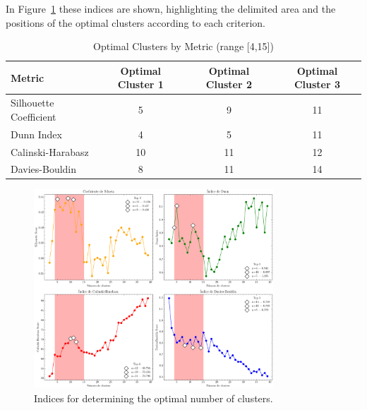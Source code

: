 \documentclass[10pt]{article}
\begin{document}
In Figure~\ref{fig:miGrafico12} these indices are shown, highlighting the delimited area and the positions of the optimal clusters according to each criterion.


\begin{table}[h]
    \centering
    \caption{Optimal Clusters by Metric (range [4,15])}
    \label{tab:clusters_optimos_masculine}
    \renewcommand{\arraystretch}{1.2}
    \begin{tabular}{@{}lccc@{}}
        \toprule
        \textbf{Metric}         & \textbf{Optimal Cluster 1} & \textbf{Optimal Cluster 2} & \textbf{Optimal Cluster 3} \\
        \midrule
        Silhouette Coefficient  & 5                        & 9                        & 11                       \\
        Dunn Index              & 4                        & 5                        & 11                       \\
        Calinski-Harabasz       & 10                       & 11                       & 12                       \\
        Davies-Bouldin          & 8                        & 11                       & 14                       \\
        \bottomrule
    \end{tabular}
\end{table}

\begin{figure}[h]
    \centering
    \includegraphics[width=0.8\textwidth]{plots_investing/Grafico 12.png}
    \caption{Indices for determining the optimal number of clusters.}
    \label{fig:miGrafico12}
\end{figure}
\end{document}

